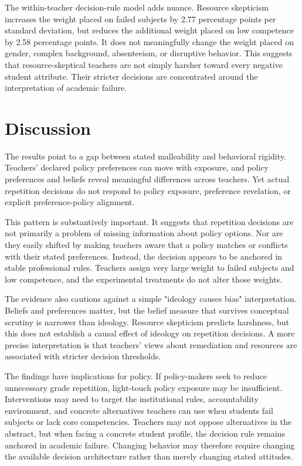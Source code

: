 \documentclass[12pt,a4paper]{article}
\begin{document}
The within-teacher decision-rule model adds nuance. Resource skepticism increases the weight placed on failed subjects by 2.77 percentage points per standard deviation, but reduces the additional weight placed on low competence by 2.58 percentage points. It does not meaningfully change the weight placed on gender, complex background, absenteeism, or disruptive behavior. This suggests that resource-skeptical teachers are not simply harsher toward every negative student attribute. Their stricter decisions are concentrated around the interpretation of academic failure.

\section{Discussion}

The results point to a gap between stated malleability and behavioral rigidity. Teachers' declared policy preferences can move with exposure, and policy preferences and beliefs reveal meaningful differences across teachers. Yet actual repetition decisions do not respond to policy exposure, preference revelation, or explicit preference-policy alignment.

This pattern is substantively important. It suggests that repetition decisions are not primarily a problem of missing information about policy options. Nor are they easily shifted by making teachers aware that a policy matches or conflicts with their stated preferences. Instead, the decision appears to be anchored in stable professional rules. Teachers assign very large weight to failed subjects and low competence, and the experimental treatments do not alter those weights.

The evidence also cautions against a simple "ideology causes bias" interpretation. Beliefs and preferences matter, but the belief measure that survives conceptual scrutiny is narrower than ideology. Resource skepticism predicts harshness, but this does not establish a causal effect of ideology on repetition decisions. A more precise interpretation is that teachers' views about remediation and resources are associated with stricter decision thresholds.

The findings have implications for policy. If policy-makers seek to reduce unnecessary grade repetition, light-touch policy exposure may be insufficient. Interventions may need to target the institutional rules, accountability environment, and concrete alternatives teachers can use when students fail subjects or lack core competencies. Teachers may not oppose alternatives in the abstract, but when facing a concrete student profile, the decision rule remains anchored in academic failure. Changing behavior may therefore require changing the available decision architecture rather than merely changing stated attitudes.
\end{document}
